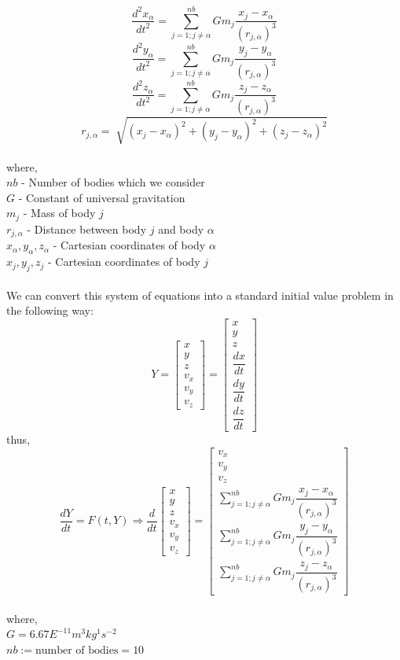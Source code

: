 \documentclass[a4paper]{article}
\begin{document}
$$\dfrac{d^{2}x_{\alpha}}{dt^{2}}=\sum_{j=1;j\neq\alpha}^{nb}Gm_{j}\dfrac{x_{j}-x_{\alpha}}{(r_{j,\alpha})^{3}}$$
$$\dfrac{d^{2}y_{\alpha}}{dt^{2}}=\sum_{j=1;j\neq\alpha}^{nb}Gm_{j}\dfrac{y_{j}-y_{\alpha}}{(r_{j,\alpha})^{3}}$$
$$\dfrac{d^{2}z_{\alpha}}{dt^{2}}=\sum_{j=1;j\neq\alpha}^{nb}Gm_{j}\dfrac{z_{j}-z_{\alpha}}{(r_{j,\alpha})^{3}}$$
$$r_{j,\alpha}=\sqrt[]{(x_{j}-x_{\alpha})^{2}+(y_{j}-y_{\alpha})^{2}+(z_{j}-z_{\alpha})^{2}}$$\\
where,\\
$nb$ - Number of bodies which we consider\\
$G$ - Constant of universal gravitation\\
$m_{j}$ - Mass of body $j$\\
$r_{j,\alpha}$ - Distance between body $j$ and body $\alpha$\\
$x_{\alpha},y_{\alpha},z_{\alpha}$ - Cartesian coordinates of body $\alpha$\\
$x_{j},y_{j},z_{j}$ - Cartesian coordinates of body $j$\\\\
We can convert this system of equations into a standard initial value problem in the following way:\\
$$Y=\begin{bmatrix}
x\\y\\z\\v_{x}\\v_{y}\\v_{z}
\end{bmatrix}=\begin{bmatrix}
x\\y\\z\\\dfrac{dx}{dt}\\\dfrac{dy}{dt}\\\dfrac{dz}{dt}
\end{bmatrix}$$
thus,\\
$$\dfrac{dY}{dt}=F(t,Y)\Rightarrow\dfrac{d}{dt}\begin{bmatrix}
x\\y\\z\\v_{x}\\v_{y}\\v_{z}
\end{bmatrix}=\begin{bmatrix}
v_{x}\\v_{y}\\v_{z}\\\sum_{j=1;j\neq\alpha}^{nb}Gm_{j}\dfrac{x_{j}-x_{\alpha}}{(r_{j,\alpha})^{3}}\\\sum_{j=1;j\neq\alpha}^{nb}Gm_{j}\dfrac{y_{j}-y_{\alpha}}{(r_{j,\alpha})^{3}}\\\sum_{j=1;j\neq\alpha}^{nb}Gm_{j}\dfrac{z_{j}-z_{\alpha}}{(r_{j,\alpha})^{3}}
\end{bmatrix}$$\\
where,\\
$G=6.67E^{-11} m^{3}kg^{1}s^{-2}$  \\
$nb := \text{number of bodies} = 10 $\\
\end{document}
